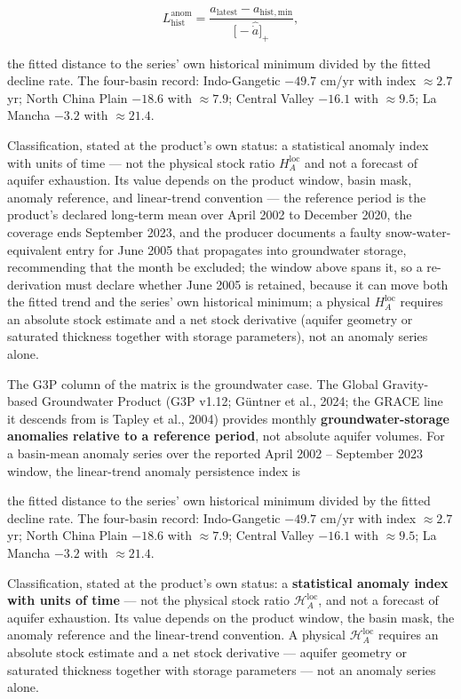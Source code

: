 \documentclass[11pt]{article}
\begin{document}
$$L_{\mathrm{hist}}^{\mathrm{anom}} = \frac{a_{\mathrm{latest}} - a_{\mathrm{hist,min}}}{\bigl[ -\widehat{\dot a} \bigr]_+},$$

 the fitted distance to the series' own historical minimum divided by the fitted decline rate. The four-basin record: Indo-Gangetic \(-49.7\) cm/\allowbreak{}yr with index \(\approx 2.7\) yr; North China Plain \(-18.6\) with \(\approx 7.9\); Central Valley \(-16.1\) with \(\approx 9.5\); La Mancha \(-3.2\) with \(\approx 21.4\).

Classification, stated at the product's own status: a statistical anomaly index with units of time --- not the physical stock ratio \(H_A^{\mathrm{loc}}\) and not a forecast of aquifer exhaustion. Its value depends on the product window, basin mask, anomaly reference, and linear-trend convention --- the reference period is the product's declared long-term mean over April 2002 to December 2020, the coverage ends September 2023, and the producer documents a faulty snow-water-equivalent entry for June 2005 that propagates into groundwater storage, recommending that the month be excluded; the window above spans it, so a re-derivation must declare whether June 2005 is retained, because it can move both the fitted trend and the series' own historical minimum; a physical \(H_A^{\mathrm{loc}}\) requires an absolute stock estimate and a net stock derivative (aquifer geometry or saturated thickness together with storage parameters), not an anomaly series alone.

The G3P column of the matrix is the groundwater case. The Global Gravity-based Groundwater Product (G3P v1.12; G\"{u}ntner et al., 2024; the GRACE line it descends from is Tapley et al., 2004) provides monthly \textbf{groundwater-storage anomalies relative to a reference period}, not absolute aquifer volumes. For a basin-mean anomaly series over the reported April 2002 -- September 2023 window, the linear-trend anomaly persistence index is

the fitted distance to the series' own historical minimum divided by the fitted decline rate. The four-basin record: Indo-Gangetic \(-49.7\) cm/\allowbreak{}yr with index \(\approx2.7\) yr; North China Plain \(-18.6\) with \(\approx7.9\); Central Valley \(-16.1\) with \(\approx9.5\); La Mancha \(-3.2\) with \(\approx21.4\).

Classification, stated at the product's own status: a \textbf{statistical anomaly index with units of time} --- not the physical stock ratio \(\mathcal H^{\mathrm{loc}}_A\), and not a forecast of aquifer exhaustion. Its value depends on the product window, the basin mask, the anomaly reference and the linear-trend convention. A physical \(\mathcal H^{\mathrm{loc}}_A\) requires an absolute stock estimate and a net stock derivative --- aquifer geometry or saturated thickness together with storage parameters --- not an anomaly series alone.
\end{document}
